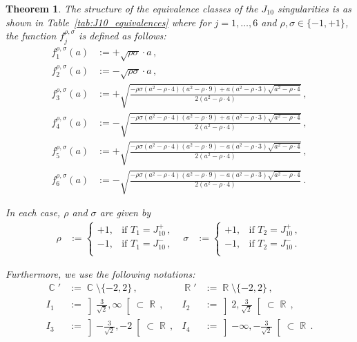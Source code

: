 \documentclass[noend]{amsproc}
\newtheorem{theorem}{Theorem}
\theoremstyle{definition}
\DeclareMathOperator{\R}{\mathbb{R}}
\DeclareMathOperator{\C}{\mathbb{C}}
\begin{document}
\begin{theorem}\label{tab:J10_equivalences_2}\label{thm:J10}
The structure of the equivalence classes of the $J_{10}$ singularities is as
shown in Table~\ref{tab:J10_equivalences} where for $j = 1, \ldots, 6$ and
$\rho, \sigma \in \{-1, +1\}$, the function $f_j^{\rho, \sigma}$ is defined as
follows:
\begin{align*}
f_1^{\rho, \sigma}(a) &:= +\sqrt{\rho \sigma} \cdot a \,, \\
f_2^{\rho, \sigma}(a) &:= -\sqrt{\rho \sigma} \cdot a \,, \\
f_3^{\rho, \sigma}(a)
&:= + \sqrt{\frac{-\rho \sigma (a^2-\rho \cdot 4) (a^2-\rho \cdot 9)
    + a (a^2-\rho \cdot 3) \sqrt{a^2-\rho \cdot 4}}{2(a^2-\rho \cdot 4)}}\,, \\
f_4^{\rho, \sigma}(a)
&:= - \sqrt{\frac{-\rho \sigma (a^2-\rho \cdot 4) (a^2-\rho \cdot 9)
    + a (a^2-\rho \cdot 3) \sqrt{a^2-\rho \cdot 4}}{2(a^2-\rho \cdot 4)}}\,, \\
f_5^{\rho, \sigma}(a)
&:= + \sqrt{\frac{-\rho \sigma (a^2-\rho \cdot 4) (a^2-\rho \cdot 9)
    - a (a^2-\rho \cdot 3) \sqrt{a^2-\rho \cdot 4}}{2(a^2-\rho \cdot 4)}}\,, \\
f_6^{\rho, \sigma}(a)
&:= - \sqrt{\frac{-\rho \sigma (a^2-\rho \cdot 4) (a^2-\rho \cdot 9)
    - a (a^2-\rho \cdot 3) \sqrt{a^2-\rho \cdot 4}}{2(a^2-\rho \cdot 4)}}\,.
\end{align*}

In each case, $\rho$ and $\sigma$ are given by
\begin{align*}
\rho &:=
\begin{cases}
    +1, &\text{if } T_1 = J_{10}^+ \,, \\
    -1, &\text{if } T_1 = J_{10}^- \,, \\
\end{cases}
&\sigma &:=
\begin{cases}
    +1, &\text{if } T_2 = J_{10}^+ \,, \\
    -1, &\text{if } T_2 = J_{10}^- \,. \\
\end{cases}
\end{align*}

Furthermore, we use the following notations:
\begin{align*}
\C'  &:= \C \setminus \{ -2, 2\} \,, &
\R'  &:= \R \setminus \{ -2, 2\} \,, \\
I_1 &:= \left] {\textstyle\frac{3}{\sqrt{2}}}, \infty \right[ \subset \R \,, &
I_2 &:= \left] 2, {\textstyle\frac{3}{\sqrt{2}}} \right[ \subset \R      \,, \\
I_3 &:= \left] {\textstyle-\frac{3}{\sqrt{2}}}, -2 \right[ \subset \R    \,, &
I_4 &:= \left] -\infty, {\textstyle-\frac{3}{\sqrt{2}}} \right[ \subset \R \,.
\end{align*}


\end{theorem}
\end{document}
